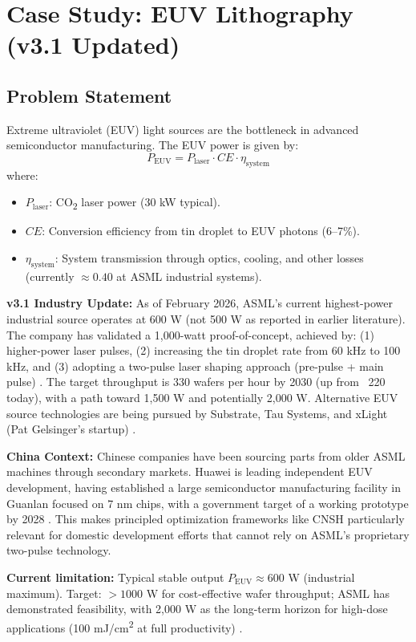 \documentclass[twocolumn]{article}
\begin{document}
\section{Case Study: EUV Lithography (v3.1 Updated)}

\subsection{Problem Statement}

Extreme ultraviolet (EUV) light sources are the bottleneck in advanced semiconductor manufacturing. The EUV power is given by:
\[
P_{\text{EUV}} = P_{\text{laser}} \cdot CE \cdot \eta_{\text{system}}
\]
where:
\begin{itemize}
  \item $P_{\text{laser}}$: CO\textsubscript{2} laser power (30 kW typical).
  \item $CE$: Conversion efficiency from tin droplet to EUV photons (6–7\%).
  \item $\eta_{\text{system}}$: System transmission through optics, cooling, and other losses (currently $\approx 0.40$ at ASML industrial systems).
\end{itemize}

\textbf{v3.1 Industry Update:} As of February 2026, ASML's current highest-power industrial source operates at 600 W (not 500 W as reported in earlier literature). The company has validated a 1,000-watt proof-of-concept, achieved by: (1) higher-power laser pulses, (2) increasing the tin droplet rate from 60 kHz to 100 kHz, and (3) adopting a two-pulse laser shaping approach (pre-pulse + main pulse) \cite{ASML2026_1000W, TechPowerUp2026}. The target throughput is 330 wafers per hour by 2030 (up from ~220 today), with a path toward 1,500 W and potentially 2,000 W. Alternative EUV source technologies are being pursued by Substrate, Tau Systems, and xLight (Pat Gelsinger's startup) \cite{BitsChips2026}.

\textbf{China Context:} Chinese companies have been sourcing parts from older ASML machines through secondary markets. Huawei is leading independent EUV development, having established a large semiconductor manufacturing facility in Guanlan focused on 7 nm chips, with a government target of a working prototype by 2028 \cite{TechPowerUp2026}. This makes principled optimization frameworks like CNSH particularly relevant for domestic development efforts that cannot rely on ASML's proprietary two-pulse technology.

\textbf{Current limitation:} Typical stable output $P_{\text{EUV}} \approx 600$ W (industrial maximum). Target: $> 1000$ W for cost-effective wafer throughput; ASML has demonstrated feasibility, with 2,000 W as the long-term horizon for high-dose applications (100 mJ/cm\textsuperscript{2} at full productivity) \cite{EUVLitho2024}.
\end{document}
